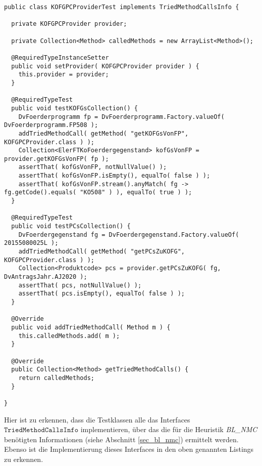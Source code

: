 \begin{lstlisting}[style = java, caption = Interface KOFGPCProviderTest, captionpos = b, label = lst_testklassen_tei7]
public class KOFGPCProviderTest implements TriedMethodCallsInfo {

  private KOFGPCProvider provider;

  private Collection<Method> calledMethods = new ArrayList<Method>();

  @RequiredTypeInstanceSetter
  public void setProvider( KOFGPCProvider provider ) {
    this.provider = provider;
  }

  @RequiredTypeTest
  public void testKOFGsCollection() {
    DvFoerderprogramm fp = DvFoerderprogramm.Factory.valueOf( DvFoerderprogramm.FP508 );
    addTriedMethodCall( getMethod( "getKOFGsVonFP", KOFGPCProvider.class ) );
    Collection<ElerFTKoFoerdergegenstand> kofGsVonFP = provider.getKOFGsVonFP( fp );
    assertThat( kofGsVonFP, notNullValue() );
    assertThat( kofGsVonFP.isEmpty(), equalTo( false ) );
    assertThat( kofGsVonFP.stream().anyMatch( fg -> fg.getCode().equals( "KO508" ) ), equalTo( true ) );
  }

  @RequiredTypeTest
  public void testPCsCollection() {
    DvFoerdergegenstand fg = DvFoerdergegenstand.Factory.valueOf( 20155080025L );
    addTriedMethodCall( getMethod( "getPCsZuKOFG", KOFGPCProvider.class ) );
    Collection<Produktcode> pcs = provider.getPCsZuKOFG( fg, DvAntragsJahr.AJ2020 );
    assertThat( pcs, notNullValue() );
    assertThat( pcs.isEmpty(), equalTo( false ) );
  }

  @Override
  public void addTriedMethodCall( Method m ) {
    this.calledMethods.add( m );
  }

  @Override
  public Collection<Method> getTriedMethodCalls() {
    return calledMethods;
  }

}
\end{lstlisting}
\noindent
Hier ist zu erkennen, dass die Testklassen alle das \Gls{Interface}s $\texttt{TriedMethodCallsInfo}$ implementieren, über das die für die Heuristik \emph{BL\_NMC} benötigten Informationen (siehe Abschnitt \ref{sec_bl_nmc}) ermittelt werden. Ebenso ist die Implementierung dieses \Gls{Interface}s in den oben genannten Listings zu erkennen.